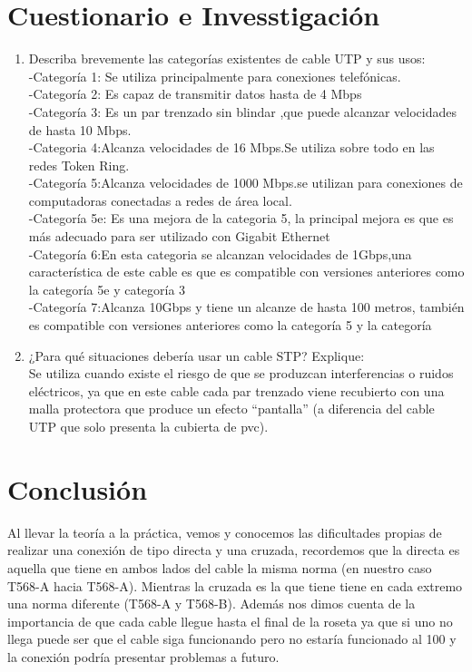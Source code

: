\documentclass[onecolumn,11pts]{IEEEtran}
\begin{document}
\section{Cuestionario e Invesstigación}
\begin{enumerate}
    \item Describa brevemente las categorías existentes de cable UTP y sus usos: \\ -Categoría 1: Se utiliza principalmente para conexiones telefónicas. \\ -Categoría 2: Es capaz de transmitir datos hasta de 4 Mbps \\ -Categoría 3: Es un par trenzado sin blindar ,que puede alcanzar velocidades de hasta 10 Mbps. \\ -Categoria 4:Alcanza velocidades de 16 Mbps.Se utiliza sobre todo en las redes Token Ring. \\ -Categoría 5:Alcanza velocidades de 1000 Mbps.se utilizan para conexiones de computadoras conectadas a redes de área local. \\ -Categoría 5e: Es una mejora de la categoria 5, la principal mejora es que es más adecuado para ser utilizado con Gigabit Ethernet \\ -Categoría 6:En esta categoria se alcanzan velocidades de 1Gbps,una característica de este cable es que es compatible con versiones anteriores como la categoría 5e y categoría 3 \\ -Categoría 7:Alcanza 10Gbps y tiene un alcanze de hasta 100 metros, también es compatible con versiones  anteriores como la categoría 5 y la categoría \\  
    \item ¿Para qué situaciones debería usar un cable STP? Explique: \\ 
	Se utiliza cuando existe el riesgo de que se produzcan interferencias o ruidos 
            eléctricos, ya que en este cable cada par trenzado viene recubierto con una malla
            protectora que produce un efecto “pantalla” (a diferencia del cable UTP que solo
            presenta la cubierta de pvc). \\

\end{enumerate}
\section{Conclusión}
Al llevar la teoría a la práctica, vemos y conocemos las dificultades propias de realizar una conexión de tipo directa y una cruzada,  recordemos que la directa es aquella que tiene en ambos lados del cable la misma norma (en nuestro caso T568-A hacia T568-A). Mientras la cruzada es la que tiene tiene en cada extremo una norma diferente (T568-A y T568-B). Además nos dimos cuenta de la importancia de que cada cable llegue hasta el final de la roseta ya que si uno no llega puede ser que el cable siga funcionando pero  no estaría funcionado al 100 y la conexión podría presentar problemas a futuro.
\end{document}
